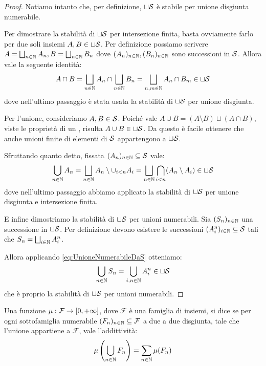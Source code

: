\begin{proof}
	Notiamo intanto che, per definizione, $\sqcup\S$ è stabile per unione disgiunta numerabile.
	
	Per dimostrare la stabilità di $\sqcup\S$ per intersezione finita, basta ovviamente farlo per due soli insiemi $A,B\in\sqcup\S$. Per definizione possiamo scrivere $A=\bigsqcup_{n\in\N} A_n, B=\bigsqcup_{n\in\N} B_n$ dove $(A_n)_{n\in\N},(B_n)_{n\in\N}$ sono successioni in $\S$. Allora vale la seguente identità:
	\begin{equation*}
		A\cap B=\bigsqcup_{n\in\N} A_n\cap\bigsqcup_{n\in\N} B_n=
		\bigsqcup_{n,m\in\N} A_n\cap B_m\in\sqcup\S
	\end{equation*}
	dove nell'ultimo passaggio è stata usata la stabilità di $\sqcup\S$ per unione disgiunta.
	
	Per l'unione, consideriamo $A,B\in\S$. Poiché vale $A\cup B=(A\setminus B)\sqcup(A\cap B)$, viste le proprietà di un \semiring{}, risulta $A\cup B\in \sqcup\S$. Da questo è facile ottenere che anche unioni finite di elementi di $\S$ appartengono a $\sqcup\S$.
	
	Sfruttando quanto detto, fissata $(A_n)_{n\in\N}\subseteq\S$ vale:
	\begin{equation}\label{eq:UnioneNumerabileDaS}
		\bigcup_{n\in\N} A_n=\bigsqcup_{n\in\N} A_n\setminus\cup_{i<n} A_i
		=\bigsqcup_{n\in\N} \bigcap_{i<n} (A_n\setminus A_i)\in\sqcup\S
	\end{equation}
	dove nell'ultimo passaggio abbiamo applicato la stabilità di $\sqcup\S$ per unione disgiunta e intersezione finita.
	
	E infine dimostriamo la stabilità di $\sqcup\S$ per unioni numerabili. Sia $(S_n)_{n\in\N}$ una successione in $\sqcup\S$. Per definizione devono esistere le successioni $(A^n_i)_{i\in\N}\subseteq \S$ tali che $S_n=\bigsqcup_{i\in\N} A^n_i$.
	
	Allora applicando \cref{eq:UnioneNumerabileDaS} otteniamo:
	\begin{equation*}
		\bigcup_{n\in\N}S_n=\bigcup_{i,n\in\N}A^n_i\in\sqcup\S 
	\end{equation*}
	che è proprio la stabilità di $\sqcup\S$ per unioni numerabili.
\end{proof}

\begin{definition}[{\sigadd[ità]}]
	Una funzione $\mu:\mathcal F\to \Rpiu$, dove $\mathcal F$ è una famiglia di insiemi, si dice \sigadd{} se per ogni sottofamiglia numerabile $(F_n)_{n\in\N}\subseteq \mathcal F$ a due a due disgiunta, tale che l'unione appartiene a $\mathcal F$, vale l'addittività:
	\begin{equation*}
		\mu\left(\bigcup_{n\in\N}F_n \right)=\sum_{n\in\N} \mu(F_n) 
	\end{equation*}
\end{definition}

